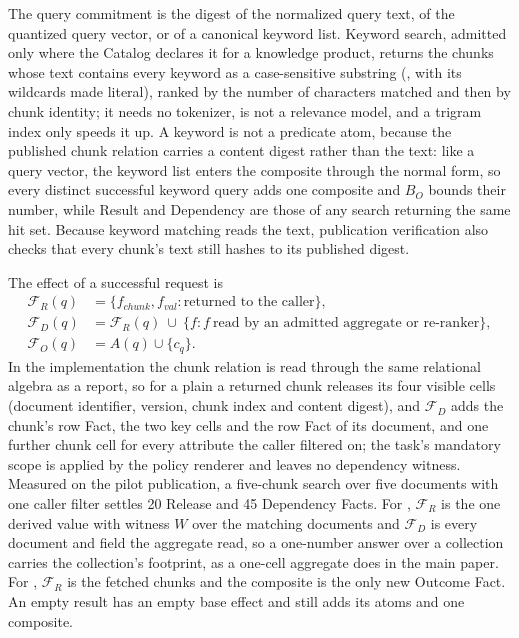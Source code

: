 \documentclass[journal,onecolumn]{IEEEtran}
\newcommand{\code}[1]{\texttt{\detokenize{#1}}}
\newcommand{\facts}{\mathcal F}
\begin{document}
The query commitment is the digest of the normalized query text, of the
quantized query vector, or of a canonical keyword list. Keyword search,
admitted only where the Catalog declares it for a knowledge product, returns
the chunks whose text contains every keyword as a case-sensitive substring
(\code{LIKE}, with its wildcards made literal), ranked by the number of
characters matched and then by chunk identity; it needs no tokenizer, is not a
relevance model, and a trigram index only speeds it up. A keyword is not a
predicate atom, because the published chunk relation carries a content digest
rather than the text: like a query vector, the keyword list enters the
composite through the normal form, so every distinct successful keyword query
adds one composite and $B_O$ bounds their number, while Result and Dependency
are those of any search returning the same hit set. Because keyword matching
reads the text, publication verification also checks that every chunk's text
still hashes to its published digest.

The effect of a successful request is
\begin{align*}
 \facts_R(q) &= \{f_{chunk}, f_{val} : \text{returned to the caller}\},\\
 \facts_D(q) &= \facts_R(q)\ \cup\ \{f : f\ \text{read by an admitted aggregate or re-ranker}\},\\
 \facts_O(q) &= A(q)\cup\{c_q\}.
\end{align*}
In the implementation the chunk relation is read through the same relational
algebra as a report, so for a plain \code{search} a returned chunk releases
its four visible cells (document identifier, version, chunk index and content digest),
and $\facts_D$ adds the chunk's row Fact, the two key cells and the row Fact
of its document, and one further chunk cell for every attribute the caller
filtered on; the task's mandatory scope is applied by the policy renderer and
leaves no dependency witness. Measured on the pilot publication, a
five-chunk search over five documents with one caller filter settles 20
Release and 45 Dependency Facts. For \code{aggregate}, $\facts_R$ is the one derived
value with witness $W$ over the matching documents and $\facts_D$ is every
document and field the aggregate read, so a one-number answer over a
collection carries the collection's footprint, as a one-cell aggregate does
in the main paper. For \code{fetch}, $\facts_R$ is the fetched chunks and
the composite is the only new Outcome Fact. An empty result has an empty base
effect and still adds its atoms and one composite.
\end{document}

